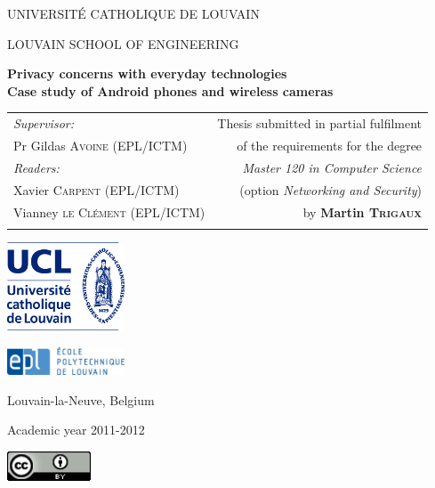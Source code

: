 
\begin{center}

\Large UNIVERSITÉ CATHOLIQUE DE LOUVAIN

\vspace{3pt}

\large LOUVAIN SCHOOL OF ENGINEERING

\vspace{2cm}
\huge\bfseries Privacy concerns with everyday technologies \\ \vspace{6pt}
\Large Case study of Android phones and wireless cameras
\end{center}

\vspace{1.8cm}

\normalsize

\setlength{\tabcolsep}{0.4cm} 
\begin{tabular}{l r}
\emph{Supervisor:}                                                &  Thesis submitted in partial fulfilment \\[+3 pt]
Pr Gildas \textsc{Avoine} \footnotesize (EPL/ICTM) \normalsize  &  of the requirements for the degree \\[+3 pt]
\emph{Readers:}		                                  &  \emph{Master 120 in Computer Science} \\[+3 pt]
Xavier \textsc{Carpent} \footnotesize (EPL/ICTM) \normalsize    &  (option \emph{Networking and Security}) \\[+3 pt]
Vianney \textsc{le Clément} \footnotesize (EPL/ICTM) \normalsize    &  by \textbf{Martin \textsc{Trigaux}} \\[+3 pt]
    &  \\[+3 pt]
\end{tabular}

\vspace{1.5cm}

\begin{center}
\includegraphics[width=3.5cm,clip=true]{images/logoUCL.jpg} 

\includegraphics[width=3.5cm,clip=true]{images/logoEPL.jpg}
\end{center}

\vspace{0.2cm}

\begin{center}
\normalsize
Louvain-la-Neuve, Belgium

\vspace{3pt}

Academic year 2011-2012

\vspace{20pt}

\includegraphics[width=2.5cm,clip=true]{images/logoCC.png}
\end{center}

\thispagestyle{empty}

